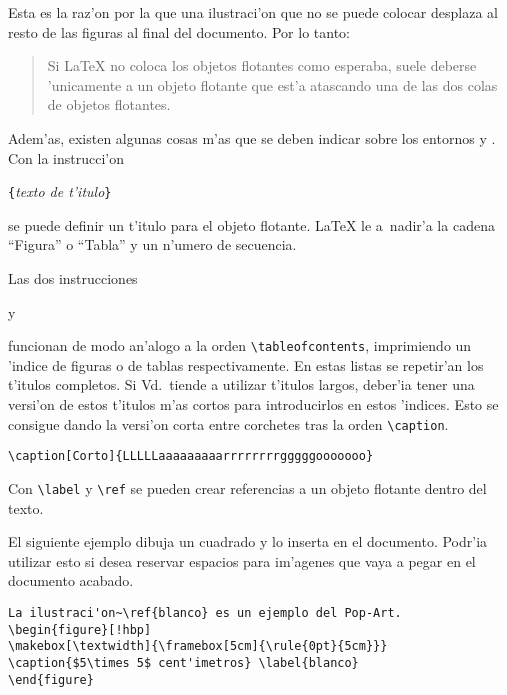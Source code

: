 Esta es la raz'on por la que una ilustraci'on que no se puede colocar
desplaza al resto de las figuras al final del documento. Por lo tanto:


\begin{quote}
  Si \LaTeX{} no coloca los objetos flotantes como esperaba, suele
  deberse 'unicamente a un objeto flotante que est'a atascando una de
  las dos colas de objetos flotantes.
\end{quote}

\bigskip
\noindent Adem'as, existen algunas cosas m'as que se deben indicar
sobre los entornos  y . Con la instrucci'on
\begin{command}
\verb|{|\emph{texto de t'itulo}\verb|}|
\end{command}
\noindent se puede definir un t'itulo para el objeto flotante. \LaTeX{}
le a~nadir'a la cadena ``Figura'' o ``Tabla'' y un n'umero de secuencia.


Las dos instrucciones
\begin{command}
 y 
\end{command}
\noindent funcionan de modo an'alogo a la orden
\verb|\tableofcontents|, imprimiendo un 'indice de figuras o de tablas
respectivamente. En estas listas se repetir'an los t'itulos
completos. Si Vd.\ tiende a utilizar t'itulos largos, deber'ia tener
una versi'on de estos t'itulos m'as cortos para introducirlos en estos
'indices. Esto se consigue dando la versi'on corta entre corchetes
tras la orden \verb|\caption|.
\begin{code}
\verb|\caption[Corto]{LLLLLaaaaaaaaarrrrrrrrgggggooooooo}|
\end{code}

Con \verb|\label| y \verb|\ref| se pueden crear referencias a un
objeto flotante dentro del texto.

El siguiente ejemplo dibuja un cuadrado y lo inserta en el
documento. Podr'ia utilizar esto si desea reservar espacios para
im'agenes que vaya a pegar en el documento acabado.

\begin{code}
\begin{verbatim}
La ilustraci'on~\ref{blanco} es un ejemplo del Pop-Art.
\begin{figure}[!hbp]
\makebox[\textwidth]{\framebox[5cm]{\rule{0pt}{5cm}}}
\caption{$5\times 5$ cent'imetros} \label{blanco}
\end{figure}
\end{verbatim}
\end{code}

